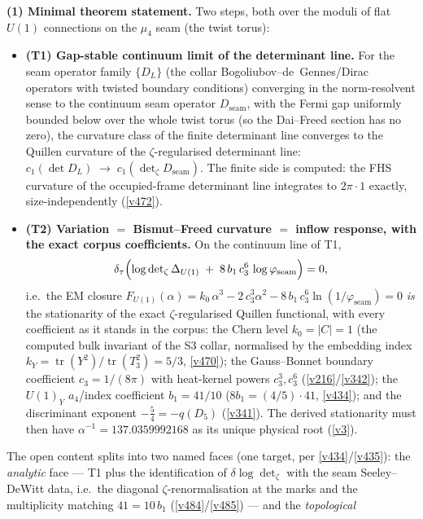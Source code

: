 \documentclass[11pt,a4paper]{article}
\newcommand{\cthree}{c_3}
\begin{document}
\par\smallskip\noindent\textbf{(1) Minimal theorem statement.} Two steps, both over the moduli
of flat $U(1)$ connections on the $\mu_4$ seam (the twist torus):
\begin{itemize}
\item \textbf{(T1) Gap-stable continuum limit of the determinant line.} For the seam operator
  family $\{D_L\}$ (the collar Bogoliubov--de~Gennes/Dirac operators with twisted boundary
  conditions) converging in the norm-resolvent sense to the continuum seam operator
  $D_{\mathrm{seam}}$, with the Fermi gap uniformly bounded below over the whole twist torus
  (so the Dai--Freed section has no zero), the curvature class of the finite determinant line
  converges to the Quillen curvature of the $\zeta$-regularised determinant line:
  $c_1(\det D_L)\;\to\;c_1(\det\nolimits_\zeta D_{\mathrm{seam}})$. The finite side is computed:
  the FHS curvature of the occupied-frame determinant line integrates to $2\pi\cdot1$ exactly,
  size-independently (\vref{v472}).
\item \textbf{(T2) Variation $=$ Bismut--Freed curvature $=$ inflow response, with the exact
  corpus coefficients.} On the continuum line of T1,
  \[
    \delta_\tau\Bigl(\log\det\nolimits_\zeta\Delta_{U(1)}\;+\;8\,b_1\,\cthree^{6}\,
    \log\varphi_{\mathrm{seam}}\Bigr)=0 ,
  \]
  i.e.\ the EM closure $F_{U(1)}(\alpha)=k_0\,\alpha^3-2\,\cthree^{3}\alpha^2-8\,b_1\,\cthree^{6}
  \ln(1/\varphi_{\mathrm{seam}})=0$ \emph{is} the stationarity of the exact
  $\zeta$-regularised Quillen functional, with every coefficient as it stands in the corpus:
  the Chern level $k_0=|C|=1$ (the computed bulk invariant of the S3 collar, normalised by the
  embedding index $k_Y=\operatorname{tr}(Y^2)/\operatorname{tr}(T_3^2)=5/3$, \vref{v470}); the
  Gauss--Bonnet boundary coefficient $\cthree=1/(8\pi)$ with heat-kernel powers
  $\cthree^{3},\cthree^{6}$ (\vref{v216}/\vref{v342}); the $U(1)_Y$ $a_4$/index coefficient
  $b_1=41/10$ ($8b_1=(4/5)\cdot41$, \vref{v434}); and the discriminant exponent
  $-\tfrac54=-q(D_5)$ (\vref{v341}). The derived stationarity must then have
  $\alpha^{-1}=137.0359992168$ as its unique physical root (\vref{v3}).
\end{itemize}
The open content splits into two named faces (one target, per \vref{v434}/\vref{v435}): the
\emph{analytic} face --- T1 plus the identification of $\delta\log\det_\zeta$ with the seam
Seeley--DeWitt data, i.e.\ the diagonal $\zeta$-renormalisation at the marks and the
multiplicity matching $41=10\,b_1$ (\vref{v484}/\vref{v485}) --- and the \emph{topological}
\end{document}
